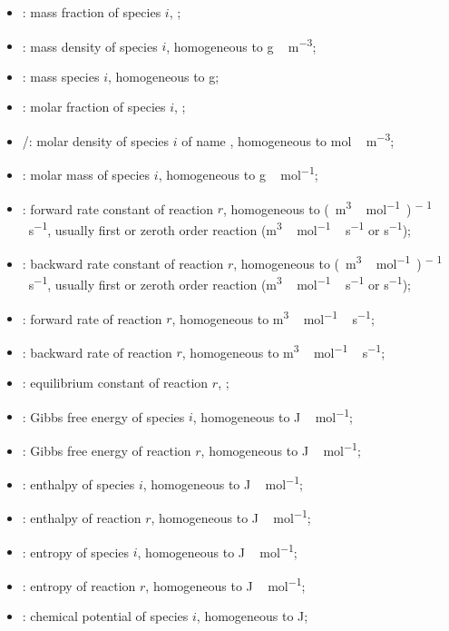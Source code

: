 \begin{itemize}
\item \massfrac[i]:       mass fraction of species $i$, \nounit;
\item \mass[i]:           mass density of species $i$, homogeneous to \unit{g\,m^{-3}};
\item \Mass[i]:           mass species $i$, homogeneous to \unit{g};
\item \molarfrac[i]:      molar fraction of species $i$, \nounit;
\item \molar[i]/\conc[I]: molar density of species $i$ of name , homogeneous to \unit{mol\,m^{-3}};
\item \Mm[i]:             molar mass of species $i$, homogeneous to \unit{g\,mol^{-1}};
\item \fwdratecons[r]:    forward rate constant of reaction $r$, homogeneous to \unit{(m^3\,mol^{-1})^{ - 1}\,s^{-1}},
                            usually first or zeroth order reaction (\unit{m^3\,mol^{-1}\,s^{-1}} or \unit{s^{-1}});
\item \bkwdratecons[r]:   backward rate constant of reaction $r$, homogeneous to \unit{(m^3\,mol^{-1})^{ - 1}\,s^{-1}},
                            usually first or zeroth order reaction (\unit{m^3\,mol^{-1}\,s^{-1}} or \unit{s^{-1}});
\item \fwdrate[r]:        forward rate of reaction $r$, homogeneous to \unit{m^3\,mol^{-1}\,s^{-1}}; 
\item \bkwdrate[r]:       backward rate of reaction $r$, homogeneous to \unit{m^3\,mol^{-1}\,s^{-1}}; 
\item \Eqconst[r]:        equilibrium constant of reaction $r$, \nounit;
\item \gibbs[i]:          Gibbs free energy of species $i$, homogeneous to \unit{J\,mol^{-1}};
\item \DGibbs[r]:         Gibbs free energy of reaction $r$, homogeneous to \unit{J\,mol^{-1}};
\item \enth[i]:           enthalpy of species $i$, homogeneous to \unit{J\,mol^{-1}};
\item \Denth[r]:          enthalpy of reaction $r$, homogeneous to \unit{J\,mol^{-1}};
\item \entr[i]:           entropy of species $i$, homogeneous to \unit{J\,mol^{-1}};
\item \Dentr[r]:          entropy of reaction $r$, homogeneous to \unit{J\,mol^{-1}};
\item \chempot[i]:        chemical potential of species $i$, homogeneous to \unit{J};

\end{itemize}
